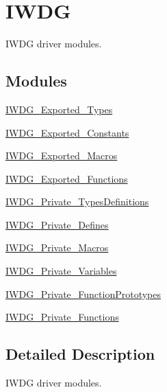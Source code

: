 \hypertarget{group___i_w_d_g}{}\section{I\+W\+DG}
\label{group___i_w_d_g}


I\+W\+DG driver modules.  


\subsection*{Modules}
\begin{DoxyCompactItemize}
\item 
\mbox{\hyperlink{group___i_w_d_g___exported___types}{I\+W\+D\+G\+\_\+\+Exported\+\_\+\+Types}}
\item 
\mbox{\hyperlink{group___i_w_d_g___exported___constants}{I\+W\+D\+G\+\_\+\+Exported\+\_\+\+Constants}}
\item 
\mbox{\hyperlink{group___i_w_d_g___exported___macros}{I\+W\+D\+G\+\_\+\+Exported\+\_\+\+Macros}}
\item 
\mbox{\hyperlink{group___i_w_d_g___exported___functions}{I\+W\+D\+G\+\_\+\+Exported\+\_\+\+Functions}}
\item 
\mbox{\hyperlink{group___i_w_d_g___private___types_definitions}{I\+W\+D\+G\+\_\+\+Private\+\_\+\+Types\+Definitions}}
\item 
\mbox{\hyperlink{group___i_w_d_g___private___defines}{I\+W\+D\+G\+\_\+\+Private\+\_\+\+Defines}}
\item 
\mbox{\hyperlink{group___i_w_d_g___private___macros}{I\+W\+D\+G\+\_\+\+Private\+\_\+\+Macros}}
\item 
\mbox{\hyperlink{group___i_w_d_g___private___variables}{I\+W\+D\+G\+\_\+\+Private\+\_\+\+Variables}}
\item 
\mbox{\hyperlink{group___i_w_d_g___private___function_prototypes}{I\+W\+D\+G\+\_\+\+Private\+\_\+\+Function\+Prototypes}}
\item 
\mbox{\hyperlink{group___i_w_d_g___private___functions}{I\+W\+D\+G\+\_\+\+Private\+\_\+\+Functions}}
\end{DoxyCompactItemize}


\subsection{Detailed Description}
I\+W\+DG driver modules. 

